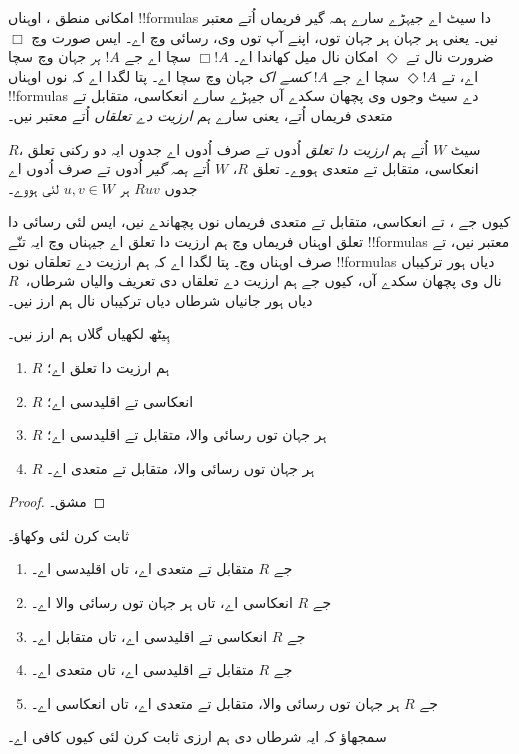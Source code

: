 \documentclass[../../../include/open-logic-section]{subfiles}
\begin{document}


امکانی منطق ، اوہناں !!{formula}s دا سیٹ اے جیہڑے سارے ہمہ گیر فریماں اُتے معتبر نیں۔ یعنی ہر جہان ہر جہان توں، اپنے آپ توں وی، رسائی وچ اے۔ ایس صورت وچ $\Box$ ضرورت نال تے $\Diamond$ امکان نال میل کھاندا اے۔ $\Box !A$ سچا اے جے $!A$ \emph{ہر} جہان وچ سچا اے، تے $\Diamond !A$ سچا اے جے $!A$ \emph{کسے اک} جہان وچ سچا اے۔ پتا لگدا اے کہ  نوں اوہناں !!{formula}s دے سیٹ وجوں وی پچھان سکدے آں جیہڑے سارے انعکاسی، متقابل تے متعدی فریماں اُتے، یعنی سارے \emph{ہم ارزیت دے تعلقاں} اُتے معتبر نیں۔

\begin{defn}
  $R$، سیٹ $W$ اُتے \emph{ہم ارزیت دا تعلق} اُدوں تے صرف اُدوں اے جدوں ایہ دو رکنی تعلق انعکاسی، متقابل تے متعدی ہووے۔ تعلق
  $R$، $W$ اُتے \emph{ہمہ گیر} اُدوں تے صرف اُدوں اے جدوں $Ruv$ ہر $u,v \in
  W$ لئی ہووے۔
\end{defn}

کیوں جے ،  تے  انعکاسی، متقابل تے متعدی فریماں نوں پچھاندے نیں، ایس لئی رسائی دا تعلق اوہناں فریماں وچ ہم ارزیت دا تعلق اے جیہناں وچ ایہ تنّے !!{formula}s معتبر نیں، تے صرف اوہناں وچ۔ پتا لگدا اے کہ ہم ارزیت دے تعلقاں نوں !!{formula}s دیاں ہور ترکیباں نال وی پچھان سکدے آں، کیوں جے ہم ارزیت دے تعلقاں دی تعریف والیاں شرطاں،~$R$ دیاں ہور جانیاں شرطاں دیاں ترکیباں نال ہم ارز نیں۔

\begin{prop}
  ہِیٹھ لکھیاں گلاں ہم ارز نیں۔
  \begin{enumerate}
  \item $R$ ہم ارزیت دا تعلق اے؛
  \item $R$ انعکاسی تے اقلیدسی اے؛
  \item $R$ ہر جہان توں رسائی والا، متقابل تے اقلیدسی اے؛
  \item $R$ ہر جہان توں رسائی والا، متقابل تے متعدی اے۔
  \end{enumerate}
\end{prop}

\begin{proof}
  مشق۔
\end{proof}

\begin{prob}
   ثابت کرن لئی وکھاؤ۔
  \begin{enumerate}
  \item جے $R$ متقابل تے متعدی اے، تاں اقلیدسی اے۔
  \item جے $R$ انعکاسی اے، تاں ہر جہان توں رسائی والا اے۔
  \item جے $R$ انعکاسی تے اقلیدسی اے، تاں متقابل اے۔
  \item جے $R$ متقابل تے اقلیدسی اے، تاں متعدی اے۔
  \item جے $R$ ہر جہان توں رسائی والا، متقابل تے متعدی اے، تاں انعکاسی اے۔
  \end{enumerate}
  سمجھاؤ کہ ایہ شرطاں دی ہم ارزی ثابت کرن لئی کیوں کافی اے۔
\end{prob}
\end{document}
